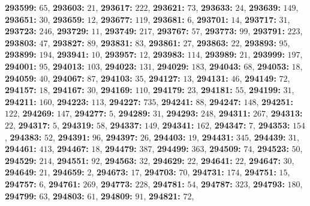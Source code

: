 \textsf{\bfseries 293599:} $65$, \textsf{\bfseries 293603:} $21$, \textsf{\bfseries 293617:} $222$, \textsf{\bfseries 293621:} $73$, \textsf{\bfseries 293633:} $24$, \textsf{\bfseries 293639:} $149$, \textsf{\bfseries 293651:} $30$, \textsf{\bfseries 293659:} $12$, \textsf{\bfseries 293677:} $119$, \textsf{\bfseries 293681:} $6$, \textsf{\bfseries 293701:} $14$, \textsf{\bfseries 293717:} $31$, \textsf{\bfseries 293723:} $246$, \textsf{\bfseries 293729:} $11$, \textsf{\bfseries 293749:} $217$, \textsf{\bfseries 293767:} $57$, \textsf{\bfseries 293773:} $99$, \textsf{\bfseries 293791:} $223$, \textsf{\bfseries 293803:} $47$, \textsf{\bfseries 293827:} $89$, \textsf{\bfseries 293831:} $83$, \textsf{\bfseries 293861:} $27$, \textsf{\bfseries 293863:} $22$, \textsf{\bfseries 293893:} $95$, \textsf{\bfseries 293899:} $194$, \textsf{\bfseries 293941:} $10$, \textsf{\bfseries 293957:} $12$, \textsf{\bfseries 293983:} $114$, \textsf{\bfseries 293989:} $21$, \textsf{\bfseries 293999:} $197$, \textsf{\bfseries 294001:} $95$, \textsf{\bfseries 294013:} $103$, \textsf{\bfseries 294023:} $131$, \textsf{\bfseries 294029:} $183$, \textsf{\bfseries 294043:} $68$, \textsf{\bfseries 294053:} $18$, \textsf{\bfseries 294059:} $40$, \textsf{\bfseries 294067:} $87$, \textsf{\bfseries 294103:} $35$, \textsf{\bfseries 294127:} $13$, \textsf{\bfseries 294131:} $46$, \textsf{\bfseries 294149:} $72$, \textsf{\bfseries 294157:} $18$, \textsf{\bfseries 294167:} $30$, \textsf{\bfseries 294169:} $110$, \textsf{\bfseries 294179:} $23$, \textsf{\bfseries 294181:} $55$, \textsf{\bfseries 294199:} $31$, \textsf{\bfseries 294211:} $160$, \textsf{\bfseries 294223:} $113$, \textsf{\bfseries 294227:} $735$, \textsf{\bfseries 294241:} $88$, \textsf{\bfseries 294247:} $148$, \textsf{\bfseries 294251:} $122$, \textsf{\bfseries 294269:} $147$, \textsf{\bfseries 294277:} $5$, \textsf{\bfseries 294289:} $31$, \textsf{\bfseries 294293:} $248$, \textsf{\bfseries 294311:} $267$, \textsf{\bfseries 294313:} $22$, \textsf{\bfseries 294317:} $5$, \textsf{\bfseries 294319:} $58$, \textsf{\bfseries 294337:} $149$, \textsf{\bfseries 294341:} $162$, \textsf{\bfseries 294347:} $7$, \textsf{\bfseries 294353:} $154$, \textsf{\bfseries 294383:} $52$, \textsf{\bfseries 294391:} $96$, \textsf{\bfseries 294397:} $26$, \textsf{\bfseries 294403:} $19$, \textsf{\bfseries 294431:} $345$, \textsf{\bfseries 294439:} $31$, \textsf{\bfseries 294461:} $413$, \textsf{\bfseries 294467:} $18$, \textsf{\bfseries 294479:} $387$, \textsf{\bfseries 294499:} $363$, \textsf{\bfseries 294509:} $74$, \textsf{\bfseries 294523:} $50$, \textsf{\bfseries 294529:} $214$, \textsf{\bfseries 294551:} $92$, \textsf{\bfseries 294563:} $32$, \textsf{\bfseries 294629:} $22$, \textsf{\bfseries 294641:} $22$, \textsf{\bfseries 294647:} $30$, \textsf{\bfseries 294649:} $21$, \textsf{\bfseries 294659:} $2$, \textsf{\bfseries 294673:} $17$, \textsf{\bfseries 294703:} $70$, \textsf{\bfseries 294731:} $174$, \textsf{\bfseries 294751:} $15$, \textsf{\bfseries 294757:} $6$, \textsf{\bfseries 294761:} $269$, \textsf{\bfseries 294773:} $228$, \textsf{\bfseries 294781:} $54$, \textsf{\bfseries 294787:} $323$, \textsf{\bfseries 294793:} $180$, \textsf{\bfseries 294799:} $63$, \textsf{\bfseries 294803:} $61$, \textsf{\bfseries 294809:} $91$, \textsf{\bfseries 294821:} $72$, 
